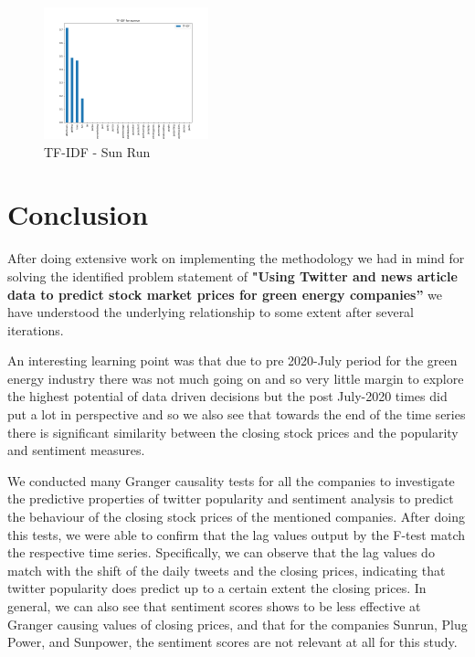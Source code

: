 \documentclass[sigconf, nonacm]{acmart}
\begin{document}
\begin{figure}[H]
  \centering
  \includegraphics[width=\linewidth, height =1.5in]{sunruntfidf.png}
  \caption{TF-IDF - Sun Run}
\end{figure}




\section{Conclusion}
After doing extensive work on implementing the methodology we had in mind for solving the identified problem statement of \textbf{"Using Twitter and news article data to predict stock market prices for green energy companies”} we have understood the underlying relationship to some extent after several iterations. \newline

An interesting learning point was that due to pre 2020-July period for the green energy industry there was not much going on and so very little margin to explore the highest potential of data driven decisions but the post July-2020 times did put a lot in perspective and so we also see that towards the end of the time series there is significant similarity between the closing stock prices and the popularity and sentiment measures. \newline 

We conducted many Granger causality tests for all the companies to investigate the predictive properties of twitter popularity and sentiment analysis to predict the behaviour of the closing stock prices of the mentioned companies.   After doing this tests, we were able to confirm that the lag values output by the F-test match the respective time series. Specifically, we can observe that the lag values do match with the shift of the daily tweets and the closing prices, indicating that twitter popularity does predict up to a certain extent the closing prices. In general, we can also see that sentiment scores shows to be less effective at Granger causing values of closing prices, and that for the companies Sunrun, Plug Power, and Sunpower, the sentiment scores are not relevant at all for this study.
\end{document}
